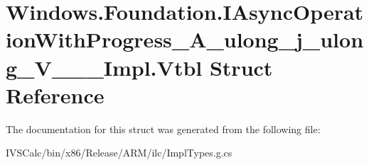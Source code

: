 \hypertarget{struct_windows_1_1_foundation_1_1_i_async_operation_with_progress___a__ulong__j__ulong___v_______impl_1_1_vtbl}{}\section{Windows.\+Foundation.\+I\+Async\+Operation\+With\+Progress\+\_\+\+A\+\_\+ulong\+\_\+j\+\_\+ulong\+\_\+\+V\+\_\+\+\_\+\+\_\+\+Impl.\+Vtbl Struct Reference}
\label{struct_windows_1_1_foundation_1_1_i_async_operation_with_progress___a__ulong__j__ulong___v_______impl_1_1_vtbl}


The documentation for this struct was generated from the following file\+:\begin{DoxyCompactItemize}
\item 
I\+V\+S\+Calc/bin/x86/\+Release/\+A\+R\+M/ilc/Impl\+Types.\+g.\+cs\end{DoxyCompactItemize}
